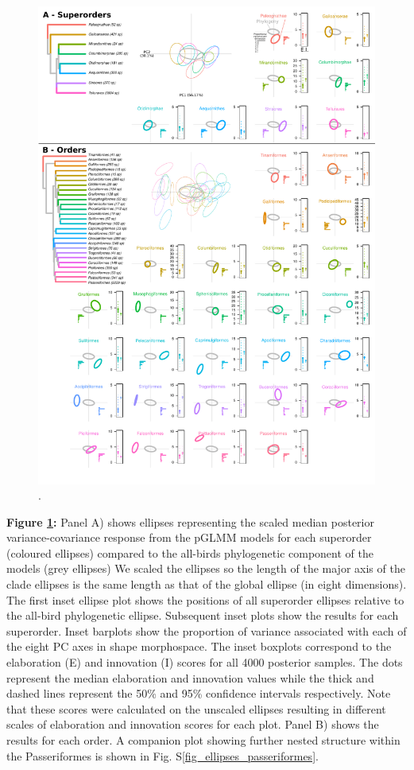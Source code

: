 \documentclass[12pt,letterpaper]{article}
\begin{document}
\begin{figure}[!htbp]
\centering
   \includegraphics[width=1\textwidth]{Figures/ellipses.pdf}
\caption{.}
\label{Fig:ellipses}
\end{figure}

\noindent \textbf{Figure \ref{Fig:ellipses}:}
Panel A) shows  ellipses representing the scaled median posterior variance-covariance response from the pGLMM models for each superorder (coloured ellipses) compared to the all-birds phylogenetic component of the models (grey ellipses)
We scaled the ellipses so the length of the major axis of the clade ellipses is the same length as that of the global ellipse (in eight dimensions).
The first inset ellipse plot shows the positions of all superorder ellipses relative to the all-bird phylogenetic ellipse.
Subsequent inset plots show the results for each superorder. Inset barplots show the proportion of variance associated with each of the eight PC axes in shape morphospace.
The inset boxplots correspond to the elaboration (E) and innovation (I) scores for all 4000 posterior samples.
The dots represent the median elaboration and innovation values while the thick and dashed lines represent the 50\% and 95\% confidence intervals respectively.
Note that these scores were calculated on the unscaled ellipses resulting in different scales of elaboration and innovation scores for each plot. Panel B) shows  the results for each order.
A companion plot showing further nested structure within the Passeriformes is shown in Fig. S\ref{fig_ellipses_passeriformes}.
\end{document}
